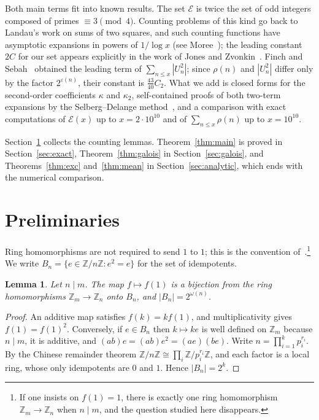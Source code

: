 \documentclass[11pt]{article}
\newtheorem{lemma}[theorem]{Lemma}
\theoremstyle{definition}
\newcommand{\Z}{\mathbb{Z}}
\newcommand{\E}{\mathcal{E}}
\renewcommand{\epsilon}{\varepsilon}
\begin{document}
Both main terms fit into known results. The set $\E$ is twice the set of odd integers composed of primes $\equiv3\pmod4$. Counting problems of this kind go back to Landau's work on sums of two squares, and such counting functions have asymptotic expansions in powers of $1/\log x$ (see Moree~\cite{Moree}); the leading constant $2C$ for our set appears explicitly in the work of Jones and Zvonkin~\cite{JZ}. Finch and Sebah~\cite{FS} obtained the leading term of $\sum_{n\le x}|U_n^2|$; since $\rho(n)$ and $|U_n^2|$ differ only by the factor $2^{\epsilon(n)}$, their constant is $\tfrac{43}{40}C_2$. What we add is closed forms for the second-order coefficients $\kappa$ and $\kappa_2$, self-contained proofs of both two-term expansions by the Selberg--Delange method~\cite[Theorem~II.5.2]{Ten}, and a comparison with exact computations of $\E(x)$ up to $x=2\cdot10^{10}$ and of $\sum_{n\le x}\rho(n)$ up to $x=10^{10}$.

Section~\ref{sec:prelim} collects the counting lemmas. Theorem~\ref{thm:main} is proved in Section~\ref{sec:exact}, Theorem~\ref{thm:galois} in Section~\ref{sec:galois}, and Theorems~\ref{thm:exc} and~\ref{thm:mean} in Section~\ref{sec:analytic}, which ends with the numerical comparison.

\section{Preliminaries}\label{sec:prelim}

Ring homomorphisms are not required to send $1$ to $1$; this is the convention of~\cite{GVB}.\footnote{If one insists on $f(1)=1$, there is exactly one ring homomorphism $\Z_m\to\Z_n$ when $n\mid m$, and the question studied here disappears.} We write $B_n=\{e\in\Z/n\Z:e^2=e\}$ for the set of idempotents.

\begin{lemma}\label{lem:ring}
Let $n\mid m$. The map $f\mapsto f(1)$ is a bijection from the ring homomorphisms $\Z_m\to\Z_n$ onto $B_n$, and $|B_n|=2^{\omega(n)}$.
\end{lemma}

\begin{proof}
An additive map satisfies $f(k)=kf(1)$, and multiplicativity gives $f(1)=f(1)^2$. Conversely, if $e\in B_n$ then $k\mapsto ke$ is well defined on $\Z_m$ because $n\mid m$, it is additive, and $(ab)e=(ab)e^2=(ae)(be)$. Write $n=\prod_{i=1}^{k}p_i^{r_i}$. By the Chinese remainder theorem $\Z/n\Z\cong\prod_i\Z/p_i^{r_i}\Z$, and each factor is a local ring, whose only idempotents are $0$ and $1$. Hence $|B_n|=2^k$.
\end{proof}
\end{document}
